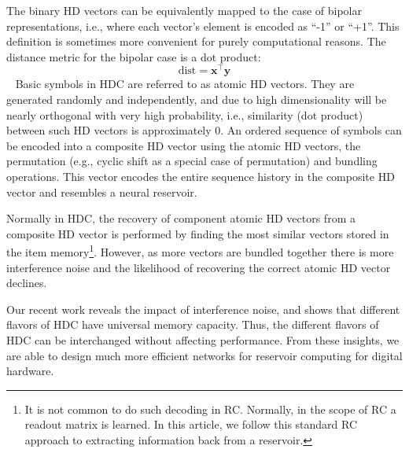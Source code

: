 The binary HD vectors can be equivalently mapped to
the case of bipolar representations, i.e., where each vector's element is
encoded as  ``-1'' or ``+1''. This definition is sometimes more convenient for
purely computational reasons. 
The distance metric for the bipolar case is a dot product:
~
\begin{equation}
\text{dist} = \textbf{x}^\top \textbf{y}
\end{equation}
~
Basic symbols in HDC are referred to as  atomic HD vectors. They are generated randomly and independently,  and due to
high dimensionality will be nearly orthogonal with very high probability, i.e., similarity
(dot product) between such HD vectors is approximately 0.
An ordered sequence of symbols can be encoded into a composite HD vector
using the atomic HD vectors, the permutation (e.g., cyclic shift as a special case of permutation) and bundling operations.
This vector encodes the entire sequence history in the composite HD vector and resembles a neural reservoir. 

Normally in HDC, the recovery of component atomic HD vectors from a composite HD vector is performed by finding the most similar vectors stored in the item memory\footnote{It is not common to do such decoding in RC. Normally, in the scope of RC a readout matrix is learned. In this article, we follow this standard RC approach to extracting information back from a reservoir.}. 
However, as more vectors are bundled together there is more interference noise and the likelihood of recovering the correct atomic HD vector declines. 

Our recent work \cite{Frady17} reveals the impact of interference noise, and shows that different flavors of HDC have universal memory capacity. Thus, the different flavors of HDC can be interchanged without affecting performance. From these insights, we are able to design much more efficient networks for reservoir computing for digital hardware. 
